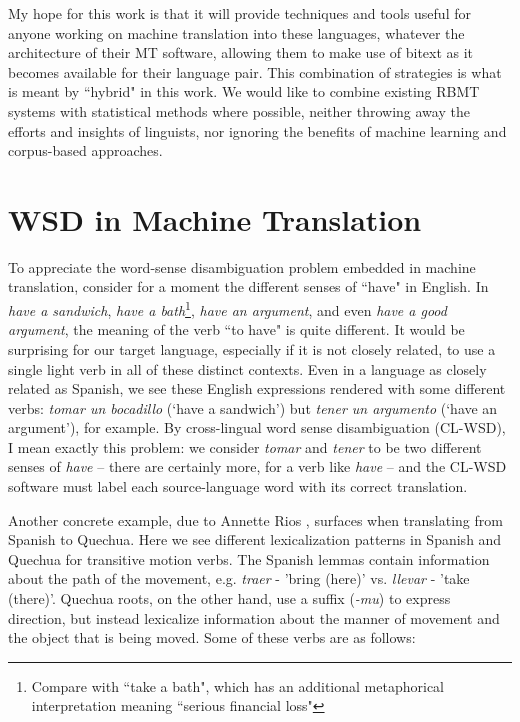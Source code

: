 My hope for this work is that it will provide techniques and tools useful for
anyone working on machine translation into these languages, whatever the
architecture of their MT software, allowing them to make use of bitext as it
becomes available for their language pair. This combination of strategies is
what is meant by ``hybrid" in this work. We would like to combine existing
RBMT systems with statistical methods where possible, neither throwing away the
efforts and insights of linguists, nor ignoring the benefits of machine
learning and corpus-based approaches.

\section{WSD in Machine Translation}
To appreciate the word-sense disambiguation problem embedded in machine
translation, consider for a moment the different senses of ``have" in
English. In \emph{have a sandwich}, \emph{have a bath}\footnote{Compare with
``take a bath", which has an additional metaphorical interpretation meaning
``serious financial loss"}, \emph{have an
argument}, and even \emph{have a good argument}, the meaning of the verb ``to
have" is quite different. It would be surprising for our target language,
especially if it is not closely related, to use a single light verb in
all of these distinct contexts. Even in a language as closely related as
Spanish, we see these English expressions rendered with some different
verbs: \emph{tomar un bocadillo} (`have a sandwich') but \emph{tener un
argumento} (`have an argument'), for example.
By cross-lingual word sense disambiguation (CL-WSD), I mean exactly this
problem: we consider \emph{tomar} and \emph{tener} to be two different
senses of \emph{have} -- there are certainly more, for a verb like \emph{have}
-- and the CL-WSD software must label each source-language word with its
correct translation.

Another concrete example, due to Annette Rios \cite{rudnick:saltmil2014},
surfaces when translating from Spanish to Quechua. 
Here we see different lexicalization patterns in Spanish and Quechua
for transitive motion verbs. The Spanish lemmas contain information about the
path of the movement, e.g. {\em traer} - 'bring (here)' vs. {\em llevar} -
'take (there)'. Quechua roots, on the other hand, use a suffix ({\em -mu}) to
express direction, but instead lexicalize information about the manner of
movement and the object that is being moved. Some of these verbs are as
follows:

